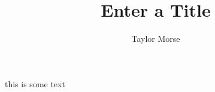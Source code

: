 \documentclass{article}
\author{Taylor Morse}
\title{Enter a Title}
\begin{document}
\maketitle

this is some text
\end{document}
